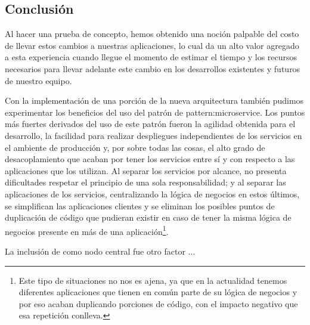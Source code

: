 \subsection{Conclusión}
\label{conclusion}

Al hacer una prueba de concepto, hemos obtenido una noción palpable del costo de llevar estos cambios a nuestras aplicaciones, lo cual da un alto valor agregado a esta experiencia cuando llegue el momento de estimar el tiempo y los recursos necesarios para llevar adelante este cambio en los desarrollos existentes y futuros de nuestro equipo.

Con la implementación de una porción de la nueva arquitectura también pudimos experimentar los beneficios del uso del patrón de \gls{pattern:microservice}. \cite[p.~27]{richards2015}Los puntos más fuertes derivados del uso de este patrón fueron la agilidad obtenida para el desarrollo, la facilidad para realizar despliegues independientes de los servicios en el ambiente de producción y, por sobre todas las cosas, el alto grado de desacoplamiento que acaban por tener los servicios entre sí y con respecto a las aplicaciones que los utilizan. Al separar los servicios por alcance, no presenta dificultades respetar el principio de una sola responsabilidad; y al separar las aplicaciones de los servicios, centralizando la lógica de negocios en estos últimos, se simplifican las aplicaciones clientes y se eliminan los posibles puntos de duplicación de código que pudieran existir en caso de tener la misma lógica de negocios presente en más de una aplicación\footnote{Este tipo de situaciones no nos es ajena, ya que en la actualidad tenemos diferentes aplicaciones que tienen en común parte de su lógica de negocios y por eso acaban duplicando porciones de código, con el impacto negativo que esa repetición conlleva.}.

La inclusión de  como nodo central fue otro factor ...

